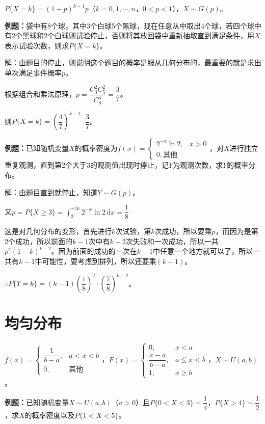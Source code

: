 \documentclass[UTF8, 12pt]{ctexart}
\begin{document}
$P\{X=k\}=(1-p)^{k-1}p$（$k=0,1,\cdots,n$，$0<p<1$），$X\sim G(p)$。

\textbf{例题：}袋中有8个球，其中3个白球5个黑球，现在任意从中取出4个球，若四个球中有2个黑球和2个白球则试验停止，否则将其放回袋中重新抽取直到满足条件，用$X$表示试验次数，则求$P\{X=k\}$。

解：由题目的停止，则说明这个题目的概率是服从几何分布的，最重要的就是求出单次满足事件概率$p$。

根据组合和乘法原理，$p=\dfrac{C_3^2C_5^2}{C_8^4}=\dfrac{3}{7}$。

则$P\{X=k\}=\left(\dfrac{4}{7}\right)^{k-1}\cdot\dfrac{3}{7}$。

\textbf{例题：}已知随机变量$X$的概率密度为$f(x)=\left\{\begin{array}{ll}
    2^{-x}\ln2, & x>0 \\
    0, \text{其他}
\end{array}\right.$，对$X$进行独立重复观测，直到第2个大于3的观测值出现时停止，记$Y$为观测次数，求$Y$的概率分布。

解：由题目直到就停止，知道$Y\sim G(p)$。

又$p=P\{X\geqslant3\}=\int_3^{+\infty}2^{-x}\ln2\,\textrm{d}x=\dfrac{1}{8}$

这是对几何分布的变形，首先进行$k$次试验，第$k$次成功，所以要乘$p$，而因为是第2个成功，所以前面的$k-1$次中有$k-2$次失败和一次成功，所以一共$p^2(1-k)^{k-2}$。因为前面的成功的一次在$k-1$中任意一个地方就可以了，所以一共有$k-1$中可能性，要考虑到排列，所以还要乘$(k-1)$。

$\therefore P\{Y=k\}=(k-1)\left(\dfrac{1}{8}\right)^2\cdot\left(\dfrac{7}{8}\right)^{k-2}$。

\section{均匀分布}

$f(x)=\left\{\begin{array}{ll}
    \dfrac{1}{b-a}, & a<x<b \\
    0, & \text{其他}
\end{array}\right.$，$F(x)=\left\{\begin{array}{ll}
    0, & x<a \\
    \dfrac{x-a}{b-a}, & a\leqslant x<b \\
    1, & x\geqslant b
\end{array}\right.$，$X\sim U(a,b)$。

\textbf{例题：}已知随机变量$X\sim U(a,b)$（$a>0$）且$P\{0<X<3\}=\dfrac{1}{4}$，$P\{X>4\}=\dfrac{1}{2}$，求$X$的概率密度以及$P\{1<X<5\}$。
\end{document}
